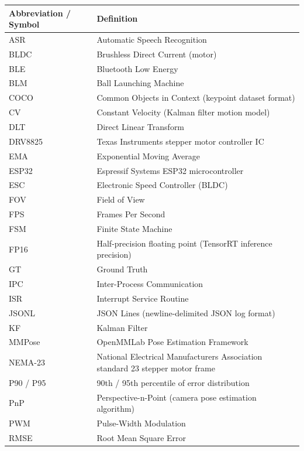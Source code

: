 
\begin{longtable}{|p{3.5cm}|p{9cm}|}
\hline
\textbf{Abbreviation / Symbol} & \textbf{Definition} \\
\hline
\endhead
\hline
\endfoot
ASR & Automatic Speech Recognition \\
\hline
BLDC & Brushless Direct Current (motor) \\
\hline
BLE & Bluetooth Low Energy \\
\hline
BLM & Ball Launching Machine \\
\hline
COCO & Common Objects in Context (keypoint dataset format) \\
\hline
CV & Constant Velocity (Kalman filter motion model) \\
\hline
DLT & Direct Linear Transform \\
\hline
DRV8825 & Texas Instruments stepper motor controller IC \\
\hline
EMA & Exponential Moving Average \\
\hline
ESP32 & Espressif Systems ESP32 microcontroller \\
\hline
ESC & Electronic Speed Controller (BLDC) \\
\hline
FOV & Field of View \\
\hline
FPS & Frames Per Second \\
\hline
FSM & Finite State Machine \\
\hline
FP16 & Half-precision floating point (TensorRT inference precision) \\
\hline
GT & Ground Truth \\
\hline
IPC & Inter-Process Communication \\
\hline
ISR & Interrupt Service Routine \\
\hline
JSONL & JSON Lines (newline-delimited JSON log format) \\
\hline
KF & Kalman Filter \\
\hline
MMPose & OpenMMLab Pose Estimation Framework \\
\hline
NEMA-23 & National Electrical Manufacturers Association standard 23 stepper motor frame \\
\hline
P90 / P95 & 90th / 95th percentile of error distribution \\
\hline
PnP & Perspective-n-Point (camera pose estimation algorithm) \\
\hline
PWM & Pulse-Width Modulation \\
\hline
RMSE & Root Mean Square Error \\

\end{longtable}
